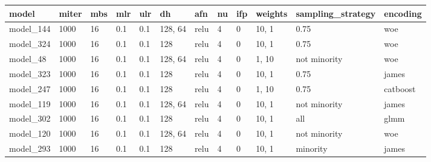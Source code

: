 \begin{tabular}{|l|l|l|l|l|l|l|l|l|l|l|l|}
\hline
\textbf{model} & \textbf{miter} & \textbf{mbs} & \textbf{mlr} & \textbf{ulr} & \textbf{dh} & \textbf{afn} & \textbf{nu} & \textbf{ifp} & \textbf{weights} & \textbf{sampling\_strategy} & \textbf{encoding} \\ \hline
model\_144     & 1000           & 16           & 0.1          & 0.1          & 128, 64     & relu         & 4           & 0            & 10, 1            & 0.75                        & woe               \\ \hline
model\_324     & 1000           & 16           & 0.1          & 0.1          & 128         & relu         & 4           & 0            & 10, 1            & 0.75                        & woe               \\ \hline
model\_48      & 1000           & 16           & 0.1          & 0.1          & 128, 64     & relu         & 4           & 0            & 1, 10            & not minority                & woe               \\ \hline
model\_323     & 1000           & 16           & 0.1          & 0.1          & 128         & relu         & 4           & 0            & 10, 1            & 0.75                        & james             \\ \hline
model\_247     & 1000           & 16           & 0.1          & 0.1          & 128         & relu         & 4           & 0            & 1, 10            & 0.75                        & catboost          \\ \hline
model\_119     & 1000           & 16           & 0.1          & 0.1          & 128, 64     & relu         & 4           & 0            & 10, 1            & not minority                & james             \\ \hline
model\_302     & 1000           & 16           & 0.1          & 0.1          & 128         & relu         & 4           & 0            & 10, 1            & all                         & glmm              \\ \hline
model\_120     & 1000           & 16           & 0.1          & 0.1          & 128, 64     & relu         & 4           & 0            & 10, 1            & not minority                & woe               \\ \hline
model\_293     & 1000           & 16           & 0.1          & 0.1          & 128         & relu         & 4           & 0            & 10, 1            & minority                    & james             \\ \hline

\end{tabular}
